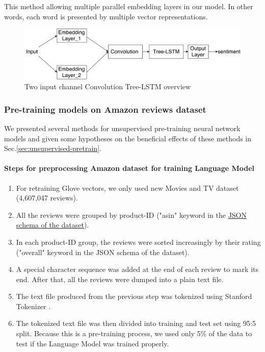This method allowing multiple parallel embedding layers in our model. 
In other words, each word is presented by multiple vector representations. 

\begin{figure}[H]
    \centering
    \includegraphics[width=0.8\linewidth]{figure/multichannelcnnlstm}
    \caption[Convolution Tree-LSTM overview]{Two input channel Convolution Tree-LSTM overview}
    \label{fig:multichannelcnnlstm}
\end{figure}


\subsubsection{Pre-training models on Amazon reviews dataset}
\label{enhan-unsupervised-pretrain}
We presented several methods for unsupervised pre-training neural network models and given some hypotheses on the beneficial effects of these methods in Sec.\ref{sec:unsupervised-pretrain}.
\paragraph{Steps for preprocessing Amazon dataset for training Language Model}
\label{sec:preprocessamazonglove-LM}
\begin{enumerate}
\item For retraining Glove vectors, we only used new Movies and TV dataset (4,607,047 reviews)\cite{McAuleyTSH15}\cite{HeM16}.
\item All the reviews were grouped by product-ID ("asin" keyword in the \hyperref[sec:amazon]{JSON schema of the dataset}). 
\item In each product-ID group, the reviews were sorted increasingly by their rating ("overall" keyword in the JSON schema of the dataset).
\item A special character sequence was added at the end of each review to mark its end.
After that, all the reviews were dumped into a plain text file.
\item The text file produced from the previous step was tokenized using Stanford Tokenizer \cite{tokenizerpart}. 
\item The tokenized text file was then divided into training and test set using 95:5 split.
Because this is a pre-training process, we used only 5\% of the data to test if the Language Model was trained properly.
\end{enumerate}

